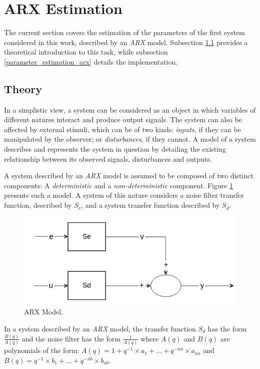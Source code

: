 \documentclass[12pt]{article}
\begin{document}
\section{ARX Estimation}
\label{arx_estimation}

The current section covers the estimation of the parameters of the first system considered in this work, described by an \emph{ARX} model. Subsection \ref{theory_arx} provides a theoretical introduction to this task, while subsection \ref{parameter_estimation_arx} details the implementation.

\subsection{Theory}
\label{theory_arx}

In a simplistic view, a system can be considered as an object in which variables of different natures interact and produce output signals. The system can also be affected by external stimuli, which can be of two kinds: \emph{inputs}, if they can be manipulated by the observer; or \emph{disturbances}, if they cannot. A model of a system describes and represents the system in question by detailing the existing relationship between its observed signals, disturbances and outputs.

A system described by an \emph{ARX} model is assumed to be composed of two distinct components: A \emph{deterministic} and a \emph{non-deterministic} component. Figure \ref{arx_model} presents such a model. A system of this nature considers a noise filter transfer function, described by $S_{e}$, and a system transfer function described by $S_{d}$.

\begin{figure}[h]
	\centering
	\includegraphics[scale=0.4]{images/arx_model.png}
	\caption{ARX Model.}
	\label{arx_model}
\end{figure}

In a system described by an \emph{ARX} model, the transfer function $S_{d}$ has the form $\frac{B(q)}{A(q)}$ and the noise filter has the form $\frac{1}{A(q)}$ where $A(q)$ and $B(q)$ are polynomials of the form: $A(q) = 1 + q^{-1} \times a_{1} + ... + q^{-na} \times a_{na}$ and $B(q) = q^{-1} \times b_{1} + ... + q^{-nb} \times b_{nb}$.
\end{document}
